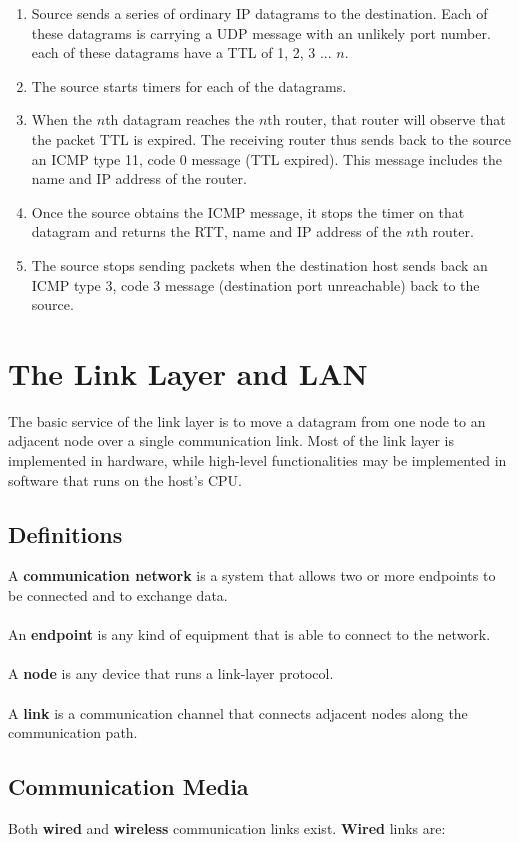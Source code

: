 \documentclass{article}
\begin{document}
\begin{enumerate}
	\item Source sends a series of ordinary IP datagrams to the destination. Each of these datagrams is carrying a UDP message with an unlikely port number. each of these datagrams have a TTL of 1, 2, 3 ... $n$.
	\item The source starts timers for each of the datagrams.
	\item When the $n$th datagram reaches the $n$th router, that router will observe that the packet TTL is expired. The receiving router thus sends back to the source an ICMP type 11, code 0 message (TTL expired). This message includes the name and IP address of the router.
	\item Once the source obtains the ICMP message, it stops the timer on that datagram and returns the RTT, name and IP address of the $n$th router.
	\item The source stops sending packets when the destination host sends back an ICMP type 3, code 3 message (destination port unreachable) back to the source.
\end{enumerate}

\section{The Link Layer and LAN}
The basic service of the link layer is to move a datagram from one node to an adjacent node over a single communication link. Most of the link layer is implemented in hardware, while high-level functionalities may be implemented in software that runs on the host's CPU.

\subsection{Definitions}
A \textbf{communication network} is a system that allows two or more endpoints to be connected and to exchange data. \\ \\
An \textbf{endpoint} is any kind of equipment that is able to connect to the network. \\ \\
A \textbf{node} is any device that runs a link-layer protocol. \\ \\
A \textbf{link} is a communication channel that connects adjacent nodes along the communication path.

\subsection{Communication Media}
Both \textbf{wired} and \textbf{wireless} communication links exist. \textbf{Wired} links are:
\end{document}
